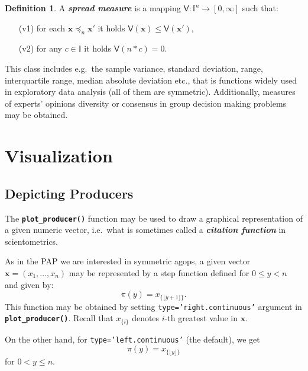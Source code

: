 \documentclass[11pt]{article}\usepackage[]{graphicx}\usepackage[]{color}
\newcommand{\hlstr}[1]{\textcolor[rgb]{0.192,0.494,0.8}{#1}}%
\newcommand{\hlkwc}[1]{\textcolor[rgb]{0.333,0.667,0.333}{#1}}%
\newcommand{\hlkwd}[1]{\textcolor[rgb]{0.737,0.353,0.396}{\textbf{#1}}}%
\renewcommand{\emph}[1]{\textbf{\textsl{#1}}}
\newcommand{\Rfunc}[1]{\texttt{\hlkwd{#1}}}
\newcommand{\argument}[1]{\texttt{\hlkwc{#1}}}
\newcommand{\str}[1]{\texttt{\hlstr{#1}}}
\newcommand{\vect}[1]{{\mathbf{#1}}}
\newcommand{\func}[1]{{\mathsf{#1}}}
\newcommand{\Ival}{\mathbb{I}}
\newcommand{\IvalPow}[1]{\mathbb{I}^{#1}}
\theoremstyle{remark}
\theoremstyle{definition}
\newtheorem{definition}[theorem]{Definition}
\begin{document}
\bigskip

\begin{definition}\label{Def:SpreadMeasure}
A \emph{spread measure} is a mapping
$\func{V}:\IvalPow{n}\to[0,\infty]$ such that:
\begin{enumerate}
 \item[(v1)] for each $\vect{x}\preccurlyeq_n\vect{x}'$
 it holds $\func{V}(\vect{x})\le\func{V}(\vect{x}')$,
 \item[(v2)] for any $c\in\Ival$
 it holds $\func{V}(n\ast c)=0$.
\end{enumerate}
\end{definition}

This class includes
e.g.~the sample variance, standard deviation, range, interquartile range,
median absolute deviation etc., that is
functions widely used in exploratory data analysis (all of them
are symmetric).
Additionally, measures of experts' opinions diversity or consensus
in group decision making problems may be obtained.




\section{Visualization}


\subsection{Depicting Producers}

The \index{\Rfunc{plot\_producer()}}\Rfunc{plot\_producer()} function may be used to draw
a graphical representation of a given numeric vector,
i.e.~what is sometimes called a \emph{citation function}
in scientometrics.

As in the PAP we are interested in symmetric agops,
a given vector $\mathbf{x}=(x_1,\dots,x_n)$ may be represented by a
step function defined for $0\le y<n$ and given by:
\[
   \pi(y)=x_{\{\lfloor y+1\rfloor\}}.
\]
This function may be obtained by setting
\texttt{\argument{type=}\str{'right.continuous'}}
argument in \Rfunc{plot\_pro\-du\-cer()}.
Recall that $x_{\{i\}}$ denotes $i$-th greatest value in $\vect{x}$.

On the other hand, for \texttt{\argument{type=}\str{'left.continuous'}}
(the default), we get
\[
\pi(y)=x_{\{\lfloor y\rfloor\}}
\]
for $0< y\le n$.
\end{document}
